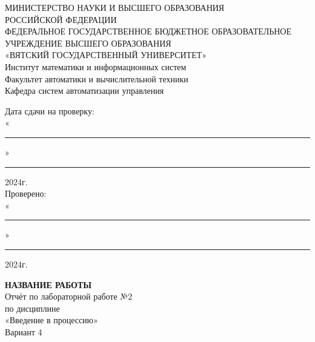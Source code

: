 \documentclass[a4paper, 10pt]{article}
\begin{document}
\vspace{10cm}
\begin{center}
  {\large
    МИНИСТЕРСТВО НАУКИ И ВЫСШЕГО ОБРАЗОВАНИЯ\\ РОССИЙСКОЙ ФЕДЕРАЦИИ \\
    \vspace{10px}
    ФЕДЕРАЛЬНОЕ ГОСУДАРСТВЕННОЕ БЮДЖЕТНОЕ ОБРАЗОВАТЕЛЬНОЕ УЧРЕЖДЕНИЕ ВЫСШЕГО ОБРАЗОВАНИЯ \\
    «ВЯТСКИЙ ГОСУДАРСТВЕННЫЙ УНИВЕРСИТЕТ»
    \\
    \vspace{10px}
    Институт математики и информационных систем\\
    \vspace{10px}
    Факультет автоматики и вычислительной техники\\
    \vspace{10px}
    Кафедра систем автоматизации управления
  }
\end{center}
\vspace{6\baselineskip}
\begin{flushright}
  
  Дата сдачи на проверку:\\
  \vspace{10px}
  «\rule[0px]{10px}{0.5px}»\rule[0px]{65px}{0.5px} 2024г.\\
  \vspace{5px}
  Проверено:~~~~~~~~~~~~~~~~~~~\\
  \vspace{10px}
  «\rule[0px]{10px}{0.5px}»\rule[0px]{65px}{0.5px} 2024г.

\end{flushright}
\vspace{2\baselineskip}
\begin{center}
  {\large
    \textbf {НАЗВАНИЕ РАБОТЫ}\\
    \vspace{10px}
    Отчёт по лабораторной работе №2 \\ по дисциплине\\
    \vspace{10px}
    «Введение в процессию»\\
    \vspace{10px}
    Вариант 4
  }
\end{center}
\vspace{4\baselineskip}
\end{document}
